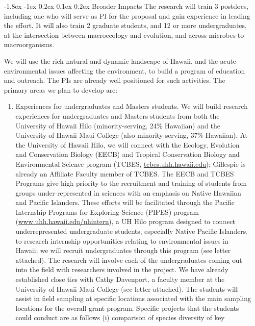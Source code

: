 \documentclass[11pt]{article}
\makeatletter
\renewcommand\section{\@startsection{section}{1}{\z@}%
                                  {-1.8ex \@plus -1ex \@minus 0.2ex}%
                                  {0.1ex \@plus 0.2ex}%
                                  {\normalfont\Large\bfseries}}
\makeatother
\begin{document}
\section{Broader Impacts}
The research will train 3 postdocs, including one who will serve as PI
for the proposal and gain experience in leading the effort. It will
also train 2 graduate students, and 12 or more undergraduates, at the
intersection between macroecology and evolution, and across microbes
to macroorganisms.

We will use the rich natural and dynamic landscape of Hawaii, and the
acute environmental issues affecting the environment, to build a
program of education and outreach. The PIs are already well positioned
for such activities. The primary areas we plan to develop are:
\begin{enumerate}
\item Experiences for undergraduates and Masters students. We will build
  research experiences for undergraduates and Masters students from
  both the University of Hawaii Hilo (minority-serving, 24\% Hawaiian)
  and the University of Hawaii Maui College (also minority-serving,
  37\% Hawaiian). At the University of Hawaii Hilo, we will connect
  with the Ecology, Evolution and Conservation Biology (EECB) and
  Tropical Conservation Biology and Environmental Science program
  (TCBES, \url{tcbes.uhh.hawaii.edu}); Gillespie is already an
  Affiliate Faculty member of TCBES. The EECB and TCBES Programs give
  high priority to the recruitment and training of students from
  groups under-represented in sciences with an emphasis on Native
  Hawaiian and Pacific Islanders. These efforts will be facilitated
  through the Pacific Internship Programs for Exploring Science
  (PIPES) program (\url{www.uhh.hawaii.edu/uhintern}), a UH
  Hilo program designed to connect underrepresented undergraduate
  students, especially Native Pacific Islanders, to research
  internship opportunities relating to environmental issues in Hawaii;
  we will recruit undergraduates through this program (see letter
  attached). The research will involve each of the undergraduates
  coming out into the field with researchers involved in the
  project. We have already established close ties with Cathy
  Davenport, a faculty member at the University of Hawaii Maui College
  (see letter attached). The students will assist in field sampling at
  specific locations associated with the main sampling locations for
  the overall grant program. Specific projects that the students could
  conduct are as follows (i) comparison of species diversity of key

\end{enumerate}
\end{document}
